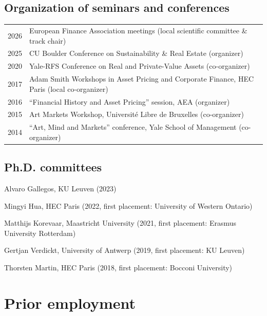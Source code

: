 \documentclass[a4paper]{article}
\begin{document}
\subsection*{Organization of seminars and conferences}

\begin{tabular}{p{2cm} p{14.7cm}}

2026 & European Finance Association meetings (local scientific committee \& track chair) \\[0.25cm] 

2025 & CU Boulder Conference on Sustainability \& Real Estate   (organizer) \\[0.25cm] 

2020 & Yale-RFS Conference on Real and Private-Value Assets (co-organizer) \\[0.25cm] 

2017 & Adam Smith Workshops in Asset Pricing and Corporate Finance, HEC Paris (local co-organizer)\\[0.25cm]

2016 & ``Financial History and Asset Pricing'' session, AEA (organizer) \\[0.25cm]

2015 & Art Markets Workshop, Universit\'{e} Libre de Bruxelles (co-organizer) \\[0.25cm]

2014 & ``Art, Mind and Markets'' conference, Yale School of Management (co-organizer) \\[0.25cm]
\end{tabular}

\subsection*{Ph.D. committees}

Alvaro Gallegos, KU Leuven (2023)

Mingyi Hua, HEC Paris (2022, first placement: University of Western Ontario)

Matthijs Korevaar, Maastricht University (2021, first placement: Erasmus University Rotterdam)

Gertjan Verdickt, University of Antwerp (2019, first placement: KU Leuven)

Thorsten Martin, HEC Paris (2018, first placement: Bocconi University)


\section*{Prior employment}
\end{document}
